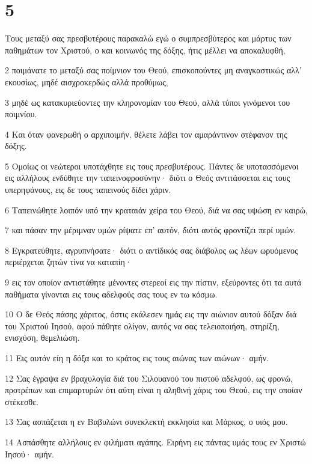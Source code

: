 \chapter{5}

\par Τους μεταξύ σας πρεσβυτέρους παρακαλώ εγώ ο συμπρεσβύτερος και μάρτυς των παθημάτων τον Χριστού, ο και κοινωνός της δόξης, ήτις μέλλει να αποκαλυφθή,
\par 2 ποιμάνατε το μεταξύ σας ποίμνιον του Θεού, επισκοπούντες μη αναγκαστικώς αλλ' εκουσίως, μηδέ αισχροκερδώς αλλά προθύμως,
\par 3 μηδέ ως κατακυριεύοντες την κληρονομίαν του Θεού, αλλά τύποι γινόμενοι του ποιμνίου.
\par 4 Και όταν φανερωθή ο αρχιποιμήν, θέλετε λάβει τον αμαράντινον στέφανον της δόξης.
\par 5 Ομοίως οι νεώτεροι υποτάχθητε εις τους πρεσβυτέρους. Πάντες δε υποτασσόμενοι εις αλλήλους ενδύθητε την ταπεινοφροσύνην· διότι ο Θεός αντιτάσσεται εις τους υπερηφάνους, εις δε τους ταπεινούς δίδει χάριν.
\par 6 Ταπεινώθητε λοιπόν υπό την κραταιάν χείρα του Θεού, διά να σας υψώση εν καιρώ,
\par 7 και πάσαν την μέριμναν υμών ρίψατε επ' αυτόν, διότι αυτός φροντίζει περί υμών.
\par 8 Εγκρατεύθητε, αγρυπνήσατε· διότι ο αντίδικός σας διάβολος ως λέων ωρυόμενος περιέρχεται ζητών τίνα να καταπίη·
\par 9 εις τον οποίον αντιστάθητε μένοντες στερεοί εις την πίστιν, εξεύροντες ότι τα αυτά παθήματα γίνονται εις τους αδελφούς σας τους εν τω κόσμω.
\par 10 Ο δε Θεός πάσης χάριτος, όστις εκάλεσεν ημάς εις την αιώνιον αυτού δόξαν διά του Χριστού Ιησού, αφού πάθητε ολίγον, αυτός να σας τελειοποιήση, στηρίξη, ενισχύση, θεμελιώση.
\par 11 Εις αυτόν είη η δόξα και το κράτος εις τους αιώνας των αιώνων· αμήν.
\par 12 Σας έγραψα εν βραχυλογία διά του Σιλουανού του πιστού αδελφού, ως φρονώ, προτρέπων και επιμαρτυρών ότι αύτη είναι η αληθινή χάρις του Θεού, εις την οποίαν στέκεσθε.
\par 13 Σας ασπάζεται η εν Βαβυλώνι συνεκλεκτή εκκλησία και Μάρκος, ο υιός μου.
\par 14 Ασπάσθητε αλλήλους εν φιλήματι αγάπης. Ειρήνη εις πάντας υμάς τους εν Χριστώ Ιησού· αμήν.


